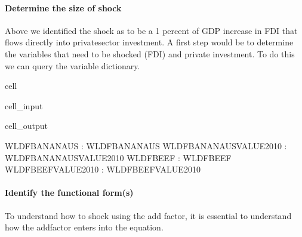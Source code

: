 \documentclass[letterpaper,10pt,english]{jupyterBook}
\begin{document}
\paragraph{Determine the size of shock}
\label{\detokenize{content/06_WBModels/LoadingWBModel:determine-the-size-of-shock}}
\sphinxAtStartPar
Above we identified the shock as to be a 1 percent of GDP increase in FDI that flows directly into private\sphinxhyphen{}sector investment.  A first step would be to determine the variables that need to be shocked (FDI) and private investment. To do this we can query the variable dictionary.

\begin{sphinxuseclass}{cell}\begin{sphinxVerbatimInput}

\begin{sphinxuseclass}{cell_input}
\begin{sphinxVerbatim}[commandchars=\\\{\}]
\PYG{p}{[}\PYG{p}{]}
\end{sphinxVerbatim}

\end{sphinxuseclass}\end{sphinxVerbatimInput}
\begin{sphinxVerbatimOutput}

\begin{sphinxuseclass}{cell_output}
\begin{sphinxVerbatim}[commandchars=\\\{\}]
WLDFBANANA\PYGZus{}US            : WLDFBANANA\PYGZus{}US
WLDFBANANA\PYGZus{}US\PYGZus{}VALUE\PYGZus{}2010 : WLDFBANANA\PYGZus{}US\PYGZus{}VALUE\PYGZus{}2010
WLDFBEEF                 : WLDFBEEF
WLDFBEEF\PYGZus{}VALUE\PYGZus{}2010      : WLDFBEEF\PYGZus{}VALUE\PYGZus{}2010
\end{sphinxVerbatim}

\end{sphinxuseclass}\end{sphinxVerbatimOutput}

\end{sphinxuseclass}

\paragraph{Identify the functional form(s)}
\label{\detokenize{content/06_WBModels/LoadingWBModel:identify-the-functional-form-s}}
\sphinxAtStartPar
To understand how to shock using the add factor, it is essential to understand how the add\sphinxhyphen{}factor enters into the equation.
\end{document}
